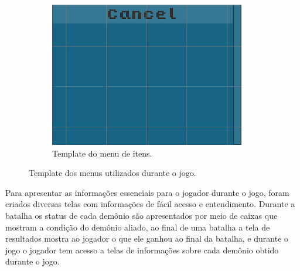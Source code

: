 \documentclass[
	12pt,				%
	openright,			%
	twoside,			%
	a4paper,			%
	english,			%
	french,				%
	spanish,			%
	brazil				%
	]{abntex2}
\begin{document}
\begin{figure}[h!]
\begin{subfigure}[b]{0.35\linewidth}
    \includegraphics[width=\linewidth]{bagtemplate.jpg}
    \caption{Template do menu de itens.}
  \end{subfigure}
  \caption{Template dos menus utilizados durante o jogo.}
  \label{fig:menus}
\end{figure}

Para apresentar as informações essenciais para o jogador durante o jogo, foram criados diversas telas com informações de fácil acesso e entendimento. Durante a batalha os status de cada demônio são apresentados por meio de caixas que mostram a condição do demônio aliado, ao final de uma batalha a tela de resultados mostra ao jogador o que ele ganhou ao final da batalha, e durante o jogo o jogador tem acesso a telas de informações sobre cada demônio obtido durante o jogo.
\end{document}

